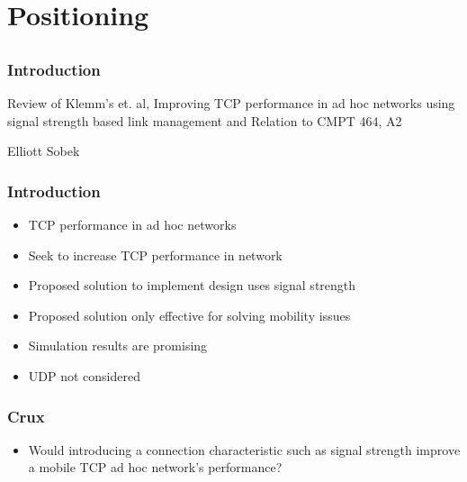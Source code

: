 \section{Positioning}
\subsection*{}


\begin{frame}[t]
  \frametitle{Introduction}
  Review of Klemm’s et. al, Improving TCP performance in ad hoc networks using signal strength based link management and Relation to CMPT 464, A2

  Elliott Sobek
  \begin{flushleft}
    \begin{tiny}
      \begin{minipage}{1.0\linewidth}
      \end{minipage}
    \end{tiny}
  \end{flushleft}

  \vfill
\end{frame}

\begin{frame}[t]
  \frametitle{Introduction}
  \begin{itemize}
  \item TCP performance in ad hoc networks
  \item Seek to increase TCP performance in network
  \item Proposed solution to implement design uses signal strength
  \item Proposed solution only effective for solving mobility issues
  \item Simulation results are promising
  \item UDP not considered
  \end{itemize}

  \vfill

\end{frame}

\begin{frame}[t]
  \frametitle{Crux}
  \begin{itemize}
  \item Would introducing a connection characteristic such as signal strength improve a mobile TCP ad hoc network’s performance?
  \end{itemize}

  \vfill

\end{frame}

